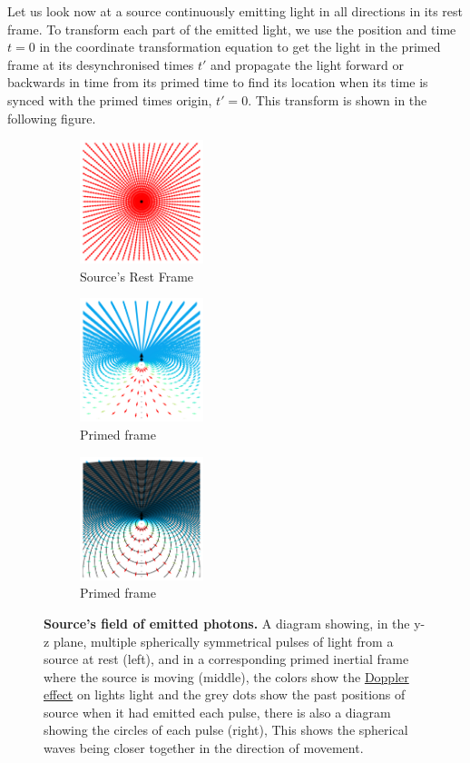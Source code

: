 Let us look now at a source continuously emitting light in all directions in its rest frame.
To transform each part of the emitted light, we use the position and time ${t}=0$ in the coordinate transformation equation to get the light in the primed frame at its desynchronised times $t'$ and propagate the light forward or backwards in time from its primed time to find its location when its time is synced with the primed times origin, $t'=0$.
This transform is shown in the following figure.

\begin{figure}[H]
	\centering
	\begin{subfigure}{.3\textwidth}
		\centering
		\includegraphics[width = 3.6cm]{images/pdf/Field_Rest_Frame.pdf}
		\caption{Source's Rest Frame}
	\end{subfigure}
	\begin{subfigure}{.3\textwidth}
		\centering
		\includegraphics[width = 3.6cm]{images/pdf/Field_Moving_Frame_Doppler.pdf}
		\caption{Primed frame}
	\end{subfigure}
	\begin{subfigure}{.3\textwidth}
		\centering
		\includegraphics[width = 3.6cm]{images/pdf/Field_Moving_Frame_Doppler_circles.pdf}
		\caption{Primed frame}
	\end{subfigure}
	\caption{\textbf{Source's field of emitted photons.} A diagram showing, in the y-z plane, multiple spherically symmetrical pulses of light from a source at rest (left), and in a corresponding primed inertial frame where the source is moving (middle), the colors show the \protect\hyperlink{def-doppler-effect}{Doppler effect} on lights light and the grey dots show the past positions of source when it had emitted each pulse, there is also a diagram showing the circles of each pulse (right), This shows the spherical waves being closer together in the direction of movement.}
	\label{fig: full field transformation}
\end{figure}

